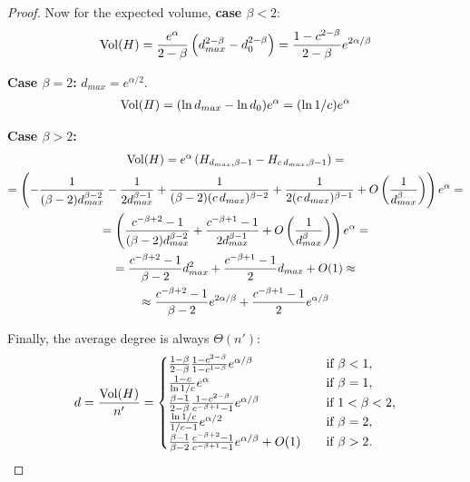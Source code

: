 \begin{proof}
    Now for the expected volume, \textbf{case $\beta<2$}:
    \begin{gather*}
        \operatorname*{Vol}(H)=\frac{e^\alpha}{2-\beta}\left(d_{max}^{2-\beta}-d_0^{2-\beta}\right)
        =\frac{1-c^{2-\beta}}{2-\beta}e^{2\alpha/\beta}
    \end{gather*}
    
    \textbf{Case $\beta=2$:}
    $d_{max}=e^{\alpha/2}$.
    \begin{gather*}
        \operatorname*{Vol}(H)=(\ln d_{max}-\ln d_0)e^\alpha=(\ln 1/c)e^\alpha
    \end{gather*}
    
    \textbf{Case $\beta>2$:}
    \begin{gather*}
        \operatorname*{Vol}(H)=e^\alpha\left(H_{d_{max},\beta-1}-H_{c\,d_{max},\beta-1}\right)=\\
        =\left(
            -\frac{1}{(\beta-2)d_{max}^{\beta-2}}-\frac{1}{2d_{max}^{\beta-1}}
            +\frac{1}{(\beta-2)(c\,d_{max})^{\beta-2}}+\frac{1}{2(c\,d_{max})^{\beta-1}}+O\left(\frac{1}{d_{max}^\beta}\right)
        \right)e^\alpha=\\
        =\left(\frac{c^{-\beta+2}-1}{(\beta-2)d_{max}^{\beta-2}}+\frac{c^{-\beta+1}-1}{2d_{max}^{\beta-1}}+O\left(\frac{1}{d_{max}^\beta}\right)\right)e^\alpha=\\
        =\frac{c^{-\beta+2}-1}{\beta-2}d_{max}^2+\frac{c^{-\beta+1}-1}{2}d_{max}+O(1)\approx\\
        \approx\frac{c^{-\beta+2}-1}{\beta-2}e^{2\alpha/\beta}+\frac{c^{-\beta+1}-1}{2}e^{\alpha/\beta}
    \end{gather*}

    Finally, the average degree is always $\Theta(n')$:
    \begin{equation*}
        d=\frac{\operatorname*{Vol}(H)}{n'}=
        \begin{cases}
            \frac{1-\beta}{2-\beta}\frac{1-c^{2-\beta}}{1-c^{1-\beta}}e^{\alpha/\beta} & \quad \text{if } \beta<1,\\
            \frac{1-c}{\ln 1/c}e^\alpha & \quad \text{if } \beta=1,\\
            \frac{\beta-1}{2-\beta}\frac{1-c^{2-\beta}}{c^{-\beta+1}-1}e^{\alpha/\beta} & \quad \text{if } 1<\beta<2,\\
            \frac{\ln 1/c}{1/c-1}e^{\alpha/2} & \quad \text{if } \beta=2,\\
            \frac{\beta-1}{\beta-2}\frac{c^{-\beta+2}-1}{c^{-\beta+1}-1}e^{\alpha/\beta}+O(1) & \quad \text{if } \beta>2.
        \end{cases}
    \end{equation*}
\end{proof}

